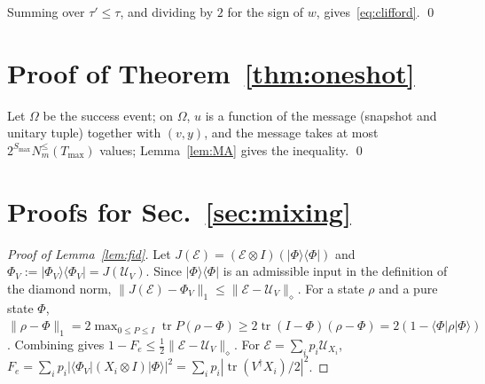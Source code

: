\documentclass[aps,prx,twocolumn,superscriptaddress,nofootinbib,longbibliography]{revtex4-2}
\theoremstyle{plain}
\theoremstyle{definition}
\theoremstyle{remark}
\newcommand{\tr}{\operatorname{tr}}
\begin{document}
Summing over $\tau'\le\tau$, and dividing by $2$ for the sign of $w$, gives~\eqref{eq:clifford}. \qed

\section{Proof of Theorem~\ref{thm:oneshot}}
Let $\Omega$ be the success event; on $\Omega$, $u$ is a function of the message (snapshot and unitary tuple) together with $(v,y)$, and the message takes at most $2^{S_{\max}}N^{\le}_m(T_{\max})$ values; Lemma~\ref{lem:MA} gives the inequality. \qed

\section{\texorpdfstring{Proofs for Sec.~\ref{sec:mixing}}{Proofs for the mixing section}}\label{app:mixing}

\begin{proof}[Proof of Lemma~\ref{lem:fid}]
Let $J(\mathcal E)=(\mathcal E\otimes I)(|\Phi\rangle\langle\Phi|)$ and $\Phi_V:=|\Phi_V\rangle\langle\Phi_V|=J(\mathcal U_V)$. Since $|\Phi\rangle\langle\Phi|$ is an admissible input in the definition of the diamond norm, $\|J(\mathcal E)-\Phi_V\|_1\le\|\mathcal E-\mathcal U_V\|_\diamond$. For a state $\rho$ and a pure state $\Phi$, $\|\rho-\Phi\|_1=2\max_{0\le P\le I}\tr P(\rho-\Phi)\ge2\tr(I-\Phi)(\rho-\Phi)=2(1-\langle\Phi|\rho|\Phi\rangle)$. Combining gives $1-F_e\le\tfrac12\|\mathcal E-\mathcal U_V\|_\diamond$. For $\mathcal E=\sum_ip_i\mathcal U_{X_i}$, $F_e=\sum_ip_i|\langle\Phi_V|(X_i\otimes I)|\Phi\rangle|^2=\sum_ip_i|\tr(V^\dagger X_i)/2|^2$.
\end{proof}
\end{document}
